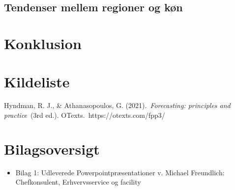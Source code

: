 \documentclass[
]{article}
\providecommand{\tightlist}{%
  \setlength{\itemsep}{0pt}\setlength{\parskip}{0pt}}\usepackage{longtable,booktabs,array}
\begin{document}
\subsection{Tendenser mellem regioner og
køn}\label{tendenser-mellem-regioner-og-kuxf8n}

\section{Konklusion}\label{konklusion}

\newpage

\section{Kildeliste}\label{kildeliste}

Hyndman, R. J., \& Athanasopoulos, G. (2021).~\emph{Forecasting:
principles and practice}~(3rd ed.). OTexts.~https://otexts.com/fpp3/

\newpage

\section{Bilagsoversigt}\label{bilagsoversigt}

\begin{itemize}
\tightlist
\item
  Bilag 1: Udleverede Powerpointpræsentationer v. Michael Freundlich:
  Chefkonsulent, Erhvervsservice og facility
\end{itemize}
\end{document}
